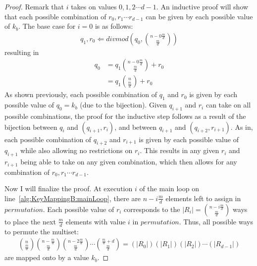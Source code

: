 \begin{proof}
Remark that $i$ takes on values $0, 1, 2 \cdots d - 1$. An inductive proof will show that each possible combination of $r_0,r_1 \cdots r_{d-1}$ can be given by each possible value of $k_b$. The base case for $i = 0$ is as follows:
\begin{align}
q_{1},r_0 \Longleftarrow \mathit{divmod}\left(q_0,{n - 0\frac{m}{d} \choose \frac{m}{d}}\right)
\end{align}
resulting in
\begin{align}
q_{0} &= q_1{n - 0\frac{m}{d} \choose \frac{m}{d}} + r_{0} \\
&= q_1{n \choose \frac{m}{d}} + r_{0}
\end{align}
As shown previously, each possible combination of $q_1$ and $r_0$ is given by each possible value of $q_0 = k_b$ (due to the bijection). Given $q_{i+1}$ and $r_i$ can take on all possible combinations, the proof for the inductive step follows as a result of the bijection between $q_{i}$ and $(q_{i+1}, r_i)$, and between $q_{i+1}$ and $(q_{i+2}, r_{i+1})$. As in, each possible combination of $q_{i+2}$ and $r_{i+1}$ is given by each possible value of $q_{i+1}$ while also allowing no restrictions on $r_i$. This results in any given $r_i$ and $r_{i+1}$ being able to take on any given combination, which then allows for any combination of $r_0,r_1 \cdots r_{d-1}$.

Now I will finalize the proof. At execution $i$ of the main loop on line~\ref{alg:KeyMappingB:mainLoop}, there are $n - i\frac{m}{d}$ elements left to assign in $\mathit{permutation}$. Each possible value of $r_i$ corresponds to the $\lvert R_i \rvert = {n - i\frac{m}{d} \choose \frac{m}{d}}$ ways to place the next $\frac{m}{d}$ elements with value $i$ in $\mathit{permutation}$. Thus, all possible ways to permute the multiset:
\begin{align}
{n \choose \frac{m}{d}}{n - \frac{m}{d} \choose \frac{m}{d}}{n - 2\frac{m}{d} \choose \frac{m}{d}}\cdots{\frac{m}{d} + d \choose \frac{m}{d}} = (\lvert R_0 \rvert)(\lvert R_1 \rvert)(\lvert R_2 \rvert)\cdots(\lvert R_{d-1} \rvert)
\end{align}
are mapped onto by a value $k_b$.
\end{proof}

